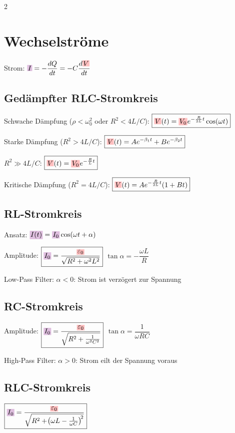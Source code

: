 \documentclass[10pt,a4paper]{article}
\newcommand{\yhbox}[1]{%
  \par\vspace{2pt}\noindent%
  \colorbox{yellow!35}{\parbox{\dimexpr\linewidth-2\fboxsep\relax}{\small#1}}%
  \par\vspace{2pt}}
\newcommand{\icc}[1]{{\setlength\fboxsep{1pt}\colorbox{violet!25}{\ensuremath{#1}}}}
\newcommand{\vc}[1]{{\setlength\fboxsep{1pt}\colorbox{red!25}{\ensuremath{#1}}}}
\begin{document}
\begin{multicols}{2}
\section{Wechselströme}

Strom: $\icc{I}=-\dfrac{dQ}{dt}=-C\dfrac{d\vc{V}}{dt}$

\subsection{Gedämpfter RLC-Stromkreis}

Schwache Dämpfung ($\rho<\omega_0^2$ oder $R^2<4L/C$):
$\boxed{\vc{V}(t)=\vc{V_0} e^{-\frac{R}{2L}t}\cos(\omega t)}$

Starke Dämpfung ($R^2>4L/C$):
$\boxed{\vc{V}(t)=Ae^{-\beta_1 t}+Be^{-\beta_2 t}}$

$R^2\gg4L/C$: $\boxed{\vc{V}(t)=\vc{V_0} e^{-\frac{R}{L}t}}$

Kritische Dämpfung ($R^2=4L/C$):
$\boxed{\vc{V}(t)=Ae^{-\frac{R}{2L}t}(1+Bt)}$

\subsection{RL-Stromkreis}

Ansatz: $\icc{I(t)}=\icc{I_0}\cos(\omega t+\alpha)$

Amplitude: $\boxed{\icc{I_0}=\dfrac{\vc{\varepsilon_0}}{\sqrt{R^2+\omega^2L^2}}}$ \quad $\tan\alpha=-\dfrac{\omega L}{R}$

\yhbox{Low-Pass Filter: $\alpha<0$: Strom ist verzögert zur Spannung}

\subsection{RC-Stromkreis}

Amplitude: $\boxed{\icc{I_0}=\dfrac{\vc{\varepsilon_0}}{\sqrt{R^2+\frac{1}{\omega^2C^2}}}}$ \quad $\tan\alpha=\dfrac{1}{\omega RC}$

\yhbox{High-Pass Filter: $\alpha>0$: Strom eilt der Spannung voraus}

\subsection{RLC-Stromkreis}

$\boxed{\icc{I_0}=\dfrac{\vc{\varepsilon_0}}{\sqrt{R^2+\!\left(\omega L-\frac{1}{\omega C}\right)^{\!2}}}}$


\end{multicols}
\end{document}
